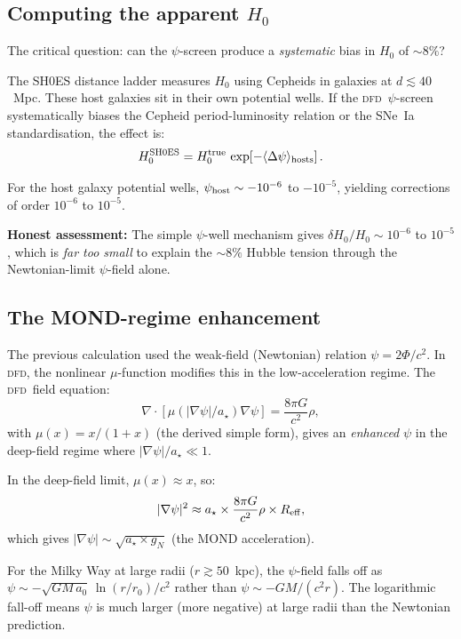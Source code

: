\documentclass[aps,prl,twocolumn,superscriptaddress,showpacs]{revtex4-2}
\newcommand{\DFD}{\textsc{dfd}}
\newcommand{\astar}{a_\star}
\newcommand{\azero}{a_0}
\begin{document}
\subsection{Computing the apparent $H_0$}

The critical question: can the $\psi$-screen produce a
\emph{systematic} bias in $H_0$ of $\sim 8\%$?

The SH0ES distance ladder measures $H_0$ using Cepheids in
galaxies at $d \lesssim 40$~Mpc.  These host galaxies sit in
their own potential wells.  If the \DFD\ $\psi$-screen
systematically biases the Cepheid period-luminosity relation
or the SNe~Ia standardisation, the effect is:
\begin{equation}
H_0^{\rm SH0ES} = H_0^{\rm true}\,
\exp\!\left[-\langle\Delta\psi\rangle_{\rm hosts}\right].
\end{equation}

For the host galaxy potential wells, $\psi_{\rm host} \sim -10^{-6}$
to $-10^{-5}$, yielding corrections of order $10^{-6}$ to $10^{-5}$.

\textbf{Honest assessment:} The simple $\psi$-well mechanism gives
$\delta H_0/H_0 \sim 10^{-6}$ to $10^{-5}$, which is
\emph{far too small} to explain the $\sim 8\%$ Hubble tension
through the Newtonian-limit $\psi$-field alone.

\subsection{The MOND-regime enhancement}

The previous calculation used the weak-field (Newtonian) relation
$\psi = 2\Phi/c^2$.  In \DFD, the nonlinear $\mu$-function
modifies this in the low-acceleration regime.  The \DFD\ field
equation:
\begin{equation}
\nabla\cdot[\mu(|\nabla\psi|/\astar)\nabla\psi]
= \frac{8\pi G}{c^2}\rho,
\end{equation}
with $\mu(x) = x/(1+x)$ (the derived simple form), gives an
\emph{enhanced} $\psi$ in the deep-field regime where
$|\nabla\psi|/\astar \ll 1$.

In the deep-field limit, $\mu(x) \approx x$, so:
\begin{equation}
|\nabla\psi|^2 \approx \astar\times\frac{8\pi G}{c^2}\rho
\times R_{\rm eff},
\end{equation}
which gives $|\nabla\psi| \sim \sqrt{\astar\times g_N}$
(the MOND acceleration).

For the Milky Way at large radii ($r \gtrsim 50$~kpc), the
$\psi$-field falls off as $\psi \sim -\sqrt{GM\,\azero}\,\ln(r/r_0)/c^2$
rather than $\psi \sim -GM/(c^2 r)$.  The logarithmic fall-off
means $\psi$ is much larger (more negative) at large radii than
the Newtonian prediction.
\end{document}
